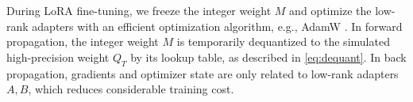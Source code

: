 During LoRA fine-tuning, we freeze the integer weight $M$ and optimize the low-rank adapters with an efficient optimization algorithm, e.g., AdamW \citep{loshchilov2017decoupled}.
In forward propagation, the integer weight $M$ is temporarily dequantized to the simulated high-precision weight $Q_T$ by its lookup table, as described in \eqref{eq:dequant}.
In back propagation, gradients and optimizer state are only related to low-rank adapters $A, B$, which reduces considerable training cost. 
